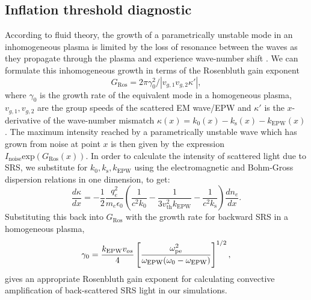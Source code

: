 \subsection{Inflation threshold diagnostic}\label{diag:threshold}
According to fluid theory, the growth of a parametrically unstable mode in an inhomogeneous plasma is limited by the loss of resonance between the waves as they propagate through the plasma and experience wave-number shift \cite{Rosenbluth1972}. We can formulate this inhomogeneous growth in terms of the Rosenbluth gain exponent\cite{Rosenbluth1972}
\begin{equation}\label{eqn:GRos}
    G_\mathrm{Ros} = 2\pi\gamma_0^2/|v_{g,1}v_{g,2}\kappa'|,
\end{equation}
where $\gamma_0$ is the growth rate of the equivalent mode in a homogeneous plasma, $v_{g,1}, v_{g,2}$ are the group speeds of the scattered EM wave/EPW and $\kappa'$ is the $x$-derivative of the wave-number mismatch $\kappa(x) = k_0(x) -k_\mathrm{s}(x) -k_\mathrm{EPW}(x)$. The maximum intensity reached by a parametrically unstable wave which has grown from noise at point $x$ is then given by the expression $I_\mathrm{noise}\mathrm{exp}(G_\mathrm{Ros}(x))$. In order to calculate the intensity of scattered light due to SRS, we substitute for $k_0,k_\mathrm{s},k_\mathrm{EPW}$ using the electromagnetic and Bohm-Gross dispersion relations in one dimension, to get:
\begin{equation}\label{eqn:kappaPrime}
    \frac{d\kappa}{dx}= -\frac{1}{2}\frac{q_e^2}{m_e\epsilon_0}
    \left(\frac{1}{c^2k_0}-\frac{1}{3v_\mathrm{th}^2k_\mathrm{EPW}}-\frac{1}{c^2k_\mathrm{s}}\right)\frac{dn_e}{dx}.
\end{equation}
Substituting this back into $G_\mathrm{Ros}$ with the growth rate for backward SRS in a homogeneous plasma\cite{kruer2003},
\begin{equation}\label{eqn:gamma0}
    \centering
    \gamma_0 = \frac{k_\mathrm{EPW}v_{os}}{4}\left[\frac{\omega_{\mathrm{pe}}^2}{\omega_\mathrm{EPW}(\omega_0-\omega_\mathrm{EPW})}\right]^{1/2},
\end{equation}
gives an appropriate Rosenbluth gain exponent for calculating convective amplification of
back-scattered SRS light in our simulations.


